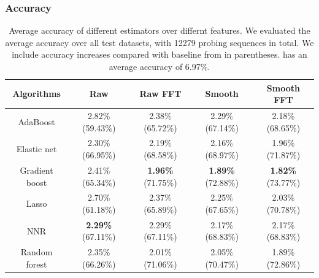 \subsubsection{Accuracy}
\label{ssub:accuracy}
\begin{table}[htpb]
   \centering
   \caption{Average accuracy of different estimators over differnt features. We
      evaluated the average accuracy over all test datasets, with 12279 probing
      sequences in total. We include accuracy increases compared with baseline
      from \cite{Yin2014} in parentheses. \cite{Yin2014} has an average
      accuracy of 6.97\%.}
   \label{tab:accuracy}
   \begin{tabular}{|c|c|c|c|c|}
      \hline
      Algorithms     & Raw                      & Raw FFT                  & Smooth                   & Smooth FFT \\ \hline
      AdaBoost       & 2.82\%(59.43\%)          & 2.38\%(65.72\%)          & 2.29\%(67.14\%)          & 2.18\%(68.65\%)\\
      Elastic net    & 2.30\%(66.95\%)          & 2.19\%(68.58\%)          & 2.16\%(68.97\%)          & 1.96\%(71.87\%)\\
      Gradient boost & 2.41\%(65.34\%)          & \textbf{1.96\%}(71.75\%) & \textbf{1.89\%}(72.88\%) & \textbf{1.82\%}(73.77\%)\\
      Lasso          & 2.70\%(61.18\%)          & 2.37\%(65.89\%)          & 2.25\%(67.65\%)          & 2.03\%(70.78\%)\\
      NNR            & \textbf{2.29\%}(67.11\%) & 2.29\%(67.11\%)          & 2.17\%(68.83\%)          & 2.17\%(68.83\%)\\
      Random forest  & 2.35\%(66.26\%)          & 2.01\%(71.06\%)          & 2.05\%(70.47\%)          & 1.89\%(72.86\%)\\
      \hline
   \end{tabular}
\end{table}

